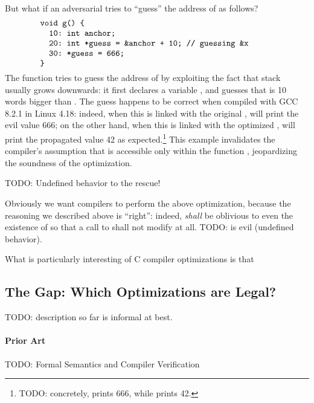 But what if an adversarial  tries to ``guess'' the address of  as follows?
%
\[
\begin{minipage}{0.8\textwidth}
\begin{verbatim}
void g() {
  10: int anchor;
  20: int *guess = &anchor + 10; // guessing &x
  30: *guess = 666;
}
\end{verbatim}
\end{minipage}
\]
%
\noindent The function  tries to guess the address of  by exploiting the fact that
stack usually grows downwards: it first declares a variable , and guesses that
 is 10 words bigger than .  The guess happens to be correct when compiled
with GCC 8.2.1 in Linux 4.18: indeed, when this  is linked with the original ,
 will print the evil value 666; on the other hand, when this  is linked with the
optimized ,  will print the propagated value 42 as expected.\footnote{TODO:
  concretely,  prints 666, while
   prints 42.}  This example
invalidates the compiler's assumption that  is accessible only within the function
, jeopardizing the soundness of the optimization.

TODO: Undefined behavior to the rescue!

Obviously we want compilers to perform the above optimization, because the reasoning we described
above is ``right'': indeed,  \emph{shall} be oblivious to even the existence of 
so that a call to  shall not modify  at all.  TODO:  is evil (undefined
behavior).

What is particularly interesting of C compiler optimizations is that



\subsection{The Gap: Which Optimizations are Legal?}


TODO: description so far is informal at best.

\paragraph{Prior Art}

TODO: Formal Semantics and Compiler Verification

